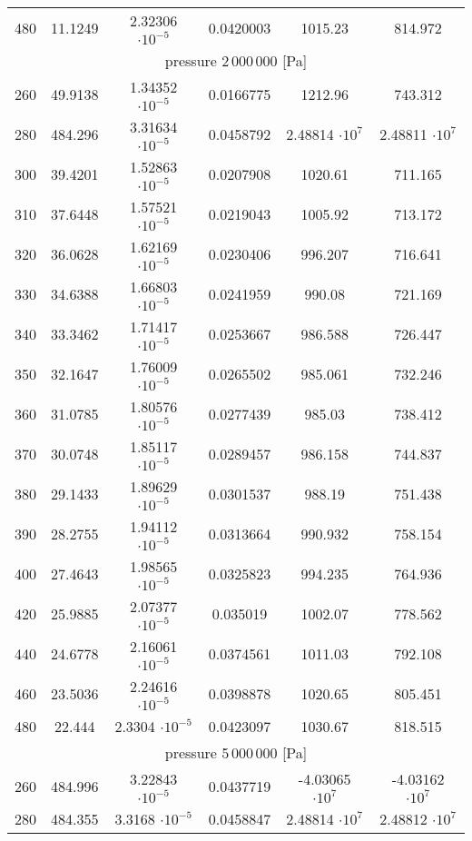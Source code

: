 \begin{table}
\begin{center}
\begin{tabular}{cccccc}
480	&	11.1249	&	2.32306 $ \cdot 10^{-5}$	&	0.0420003	&	1015.23	&	814.972	\\
\cmidrule{1-6}
\multicolumn{6}{c}{pressure 2\,000\,000 [Pa]}\\
260	&	49.9138	&	1.34352 $ \cdot 10^{-5}$	&	0.0166775	&	1212.96	&	743.312	\\
280	&	484.296	&	3.31634 $ \cdot 10^{-5}$	&	0.0458792	&	2.48814 $ \cdot 10^{7}$	&	2.48811 $ \cdot 10^{7}$	\\
300	&	39.4201	&	1.52863 $ \cdot 10^{-5}$	&	0.0207908	&	1020.61	&	711.165	\\
310	&	37.6448	&	1.57521 $ \cdot 10^{-5}$	&	0.0219043	&	1005.92	&	713.172	\\
320	&	36.0628	&	1.62169 $ \cdot 10^{-5}$	&	0.0230406	&	996.207	&	716.641	\\
330	&	34.6388	&	1.66803 $ \cdot 10^{-5}$	&	0.0241959	&	990.08	&	721.169	\\
340	&	33.3462	&	1.71417 $ \cdot 10^{-5}$	&	0.0253667	&	986.588	&	726.447	\\
350	&	32.1647	&	1.76009 $ \cdot 10^{-5}$	&	0.0265502	&	985.061	&	732.246	\\
360	&	31.0785	&	1.80576 $ \cdot 10^{-5}$	&	0.0277439	&	985.03	&	738.412	\\
370	&	30.0748	&	1.85117 $ \cdot 10^{-5}$	&	0.0289457	&	986.158	&	744.837	\\
380	&	29.1433	&	1.89629 $ \cdot 10^{-5}$	&	0.0301537	&	988.19	&	751.438	\\
390	&	28.2755	&	1.94112 $ \cdot 10^{-5}$	&	0.0313664	&	990.932	&	758.154	\\
400	&	27.4643	&	1.98565 $ \cdot 10^{-5}$	&	0.0325823	&	994.235	&	764.936	\\
420	&	25.9885	&	2.07377 $ \cdot 10^{-5}$	&	0.035019	&	1002.07	&	778.562	\\
440	&	24.6778	&	2.16061 $ \cdot 10^{-5}$	&	0.0374561	&	1011.03	&	792.108	\\
460	&	23.5036	&	2.24616 $ \cdot 10^{-5}$	&	0.0398878	&	1020.65	&	805.451	\\
480	&	22.444	&	2.3304 $ \cdot 10^{-5}$	&	0.0423097	&	1030.67	&	818.515	\\
\cmidrule{1-6}
\multicolumn{6}{c}{pressure 5\,000\,000 [Pa]}\\
260	&	484.996	&	3.22843 $ \cdot 10^{-5}$	&	0.0437719	&	-4.03065 $ \cdot 10^{7}$	&	-4.03162 $ \cdot 10^{7}$	\\
280	&	484.355	&	3.3168 $ \cdot 10^{-5}$	&	0.0458847	&	2.48814 $ \cdot 10^{7}$	&	2.48812 $ \cdot 10^{7}$	\\

\end{tabular}
\end{center}
\end{table}
